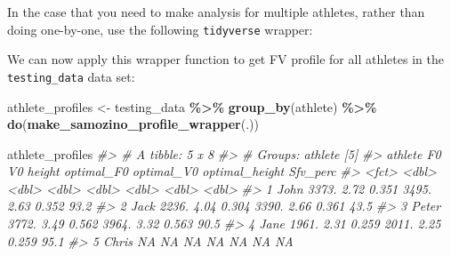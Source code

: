 \documentclass[
]{book}
\newenvironment{Shaded}{\begin{snugshade}}{\end{snugshade}}
\newcommand{\CommentTok}[1]{\textcolor[rgb]{0.56,0.35,0.01}{\textit{#1}}}
\newcommand{\ControlFlowTok}[1]{\textcolor[rgb]{0.13,0.29,0.53}{\textbf{#1}}}
\newcommand{\DataTypeTok}[1]{\textcolor[rgb]{0.13,0.29,0.53}{#1}}
\newcommand{\KeywordTok}[1]{\textcolor[rgb]{0.13,0.29,0.53}{\textbf{#1}}}
\newcommand{\NormalTok}[1]{#1}
\newcommand{\OperatorTok}[1]{\textcolor[rgb]{0.81,0.36,0.00}{\textbf{#1}}}
\newcommand{\OtherTok}[1]{\textcolor[rgb]{0.56,0.35,0.01}{#1}}
\newcommand{\StringTok}[1]{\textcolor[rgb]{0.31,0.60,0.02}{#1}}
\begin{document}
In the case that you need to make analysis for multiple athletes, rather than doing one-by-one, use the following \texttt{tidyverse} wrapper:

\begin{Shaded}
\end{Shaded}

We can now apply this wrapper function to get FV profile for all athletes in the \texttt{testing\_data} data set:

\begin{Shaded}
\begin{Highlighting}[]
\NormalTok{athlete\_profiles <{-}}\StringTok{ }\NormalTok{testing\_data }\OperatorTok{\%>\%}
\StringTok{  }\KeywordTok{group\_by}\NormalTok{(athlete) }\OperatorTok{\%>\%}
\StringTok{  }\KeywordTok{do}\NormalTok{(}\KeywordTok{make\_samozino\_profile\_wrapper}\NormalTok{(.))}


\NormalTok{athlete\_profiles}
\CommentTok{\#> \# A tibble: 5 x 8}
\CommentTok{\#> \# Groups:   athlete [5]}
\CommentTok{\#>   athlete    F0    V0 height optimal\_F0 optimal\_V0 optimal\_height Sfv\_perc}
\CommentTok{\#>   <fct>   <dbl> <dbl>  <dbl>      <dbl>      <dbl>          <dbl>    <dbl>}
\CommentTok{\#> 1 John    3373.  2.72  0.351      3495.       2.63          0.352     93.2}
\CommentTok{\#> 2 Jack    2236.  4.04  0.304      3390.       2.66          0.361     43.5}
\CommentTok{\#> 3 Peter   3772.  3.49  0.562      3964.       3.32          0.563     90.5}
\CommentTok{\#> 4 Jane    1961.  2.31  0.259      2011.       2.25          0.259     95.1}
\CommentTok{\#> 5 Chris     NA  NA    NA            NA       NA            NA         NA}
\end{Highlighting}
\end{Shaded}
\end{document}
